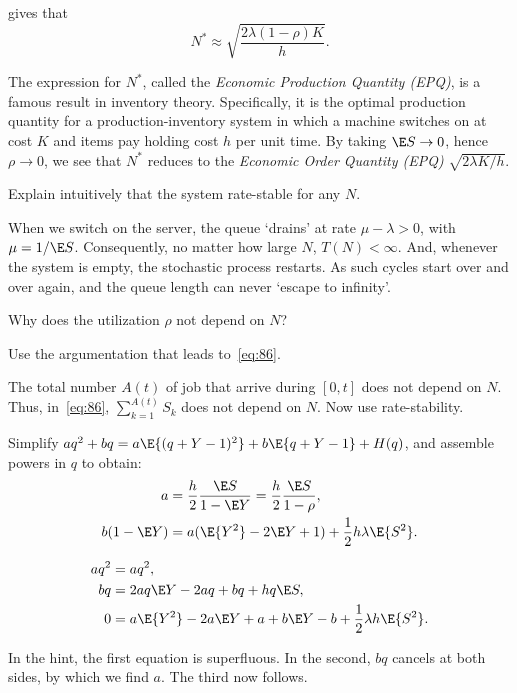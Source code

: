  gives that
\begin{equation*}
  N^* \approx \sqrt{\frac{2\lambda(1-\rho)K}{h}}.
\end{equation*}

The expression for $N^*$, called the \emph{Economic Production Quantity (EPQ)}, is a famous result in inventory theory.
Specifically, it is the optimal production quantity for a production-inventory system in which a machine switches on at cost $K$ and items pay holding cost $h$ per unit time.
By taking $\E S \to 0$, hence $\rho \to 0$, we see that $N^*$ reduces to the \emph{Economic Order Quantity (EPQ)} $\sqrt{2\lambda K/h}$.





\begin{exercise}
Explain intuitively that the system rate-stable for any $N$.
\begin{solution}
  When we switch on the server, the queue `drains' at rate $\mu-\lambda>0$, with $\mu=1/\E S$.
  Consequently, no matter how large $N$, $T(N)<\infty$.
  And, whenever the system is empty, the stochastic process restarts.
  As such cycles start over and over again, and the queue length can never `escape to infinity'.
\end{solution}
\end{exercise}


\begin{exercise}
  Why does the utilization $\rho$ not depend on $N$?
\begin{hint}
 Use the argumentation that leads to~\cref{eq:86}.
\end{hint}
\begin{solution}
  The total number $A(t)$ of job that arrive during $[0,t]$ does not depend on $N$.
  Thus, in~\cref{eq:86}, $\sum_{k=1}^{A(t)}S_k$ does not depend on $N$.
  Now use rate-stability.
\end{solution}
\end{exercise}

\begin{exercise}\label{ex:68}
Simplify $a q^2 +b q = a\E{(q+Y-1)^2} + b\E{q+Y-1}+ H(q)$, and assemble powers in $q$ to obtain:
\begin{align*}
  a &= \frac h 2 \frac{\E S}{1-\E Y} = \frac{h}{2} \frac{\E S}{1- \rho}, \\
  b(1-\E Y) &= a(\E{Y^2} - 2 \E Y + 1) + \frac 12 h \lambda \E{S^2}.
\end{align*}
\begin{hint}
\begin{align*}
  a q^2 &= a q^2, \\
  b q &= 2a q \E Y - 2a q + b q + h q \E S,\\
  0 &= a \E{Y^2} - 2a \E Y + a + b \E Y - b + \frac 12 \lambda h \E{S^2}.
\end{align*}
\end{hint}
\begin{solution}
  In the hint, the first equation is superfluous.
  In the second, $bq$ cancels at both sides, by which we find $a$.
  The third now follows.
\end{solution}
\end{exercise}

